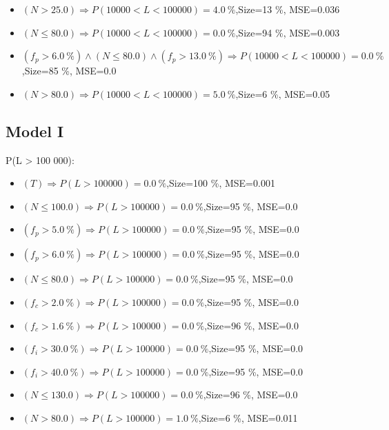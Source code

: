 \documentclass[numbered]{CSL}
\begin{document}
\begin{itemize}
\item $(N > 25.0) \Rightarrow P(10 000 < L < 100 000) = 4.0~\%$,\hfill Size=13 \%, MSE=0.036
\item $(N \leq 80.0) \Rightarrow P(10 000 < L < 100 000) = 0.0~\%$,\hfill Size=94 \%, MSE=0.003
\item $(f_p > 6.0~\%) \land (N \leq 80.0) \land (f_p > 13.0~\%) \Rightarrow P(10 000 < L < 100 000) = 0.0~\%$,\hfill Size=85 \%, MSE=0.0
\item $(N > 80.0) \Rightarrow P(10 000 < L < 100 000) = 5.0~\%$,\hfill Size=6 \%, MSE=0.05
\end{itemize}

\subsection{Model I}
P(L > 100 000):
\begin{itemize}
\item $(T) \Rightarrow P(L > 100 000) = 0.0~\%$,\hfill Size=100 \%, MSE=0.001
\item $(N \leq 100.0) \Rightarrow P(L > 100 000) = 0.0~\%$,\hfill Size=95 \%, MSE=0.0
\item $(f_p > 5.0~\%) \Rightarrow P(L > 100 000) = 0.0~\%$,\hfill Size=95 \%, MSE=0.0
\item $(f_p > 6.0~\%) \Rightarrow P(L > 100 000) = 0.0~\%$,\hfill Size=95 \%, MSE=0.0
\item $(N \leq 80.0) \Rightarrow P(L > 100 000) = 0.0~\%$,\hfill Size=95 \%, MSE=0.0
\item $(f_c > 2.0~\%) \Rightarrow P(L > 100 000) = 0.0~\%$,\hfill Size=95 \%, MSE=0.0
\item $(f_c > 1.6~\%) \Rightarrow P(L > 100 000) = 0.0~\%$,\hfill Size=96 \%, MSE=0.0
\item $(f_i > 30.0~\%) \Rightarrow P(L > 100 000) = 0.0~\%$,\hfill Size=95 \%, MSE=0.0
\item $(f_i > 40.0~\%) \Rightarrow P(L > 100 000) = 0.0~\%$,\hfill Size=95 \%, MSE=0.0
\item $(N \leq 130.0) \Rightarrow P(L > 100 000) = 0.0~\%$,\hfill Size=96 \%, MSE=0.0
\item $(N > 80.0) \Rightarrow P(L > 100 000) = 1.0~\%$,\hfill Size=6 \%, MSE=0.011
\end{itemize}
\end{document}
